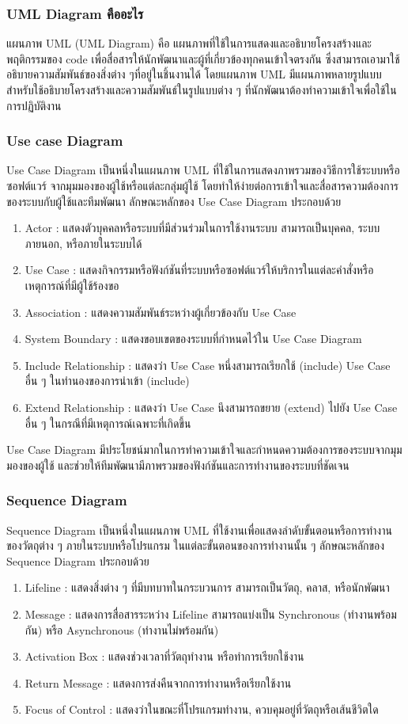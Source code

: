 \documentclass[14pt,oneside,openright,a4paper]{cpe-thai-project}
\begin{document}
\subsubsection{UML Diagram คืออะไร}
แผนภาพ UML \cite{UML} (UML Diagram) คือ แผนภาพที่ใช้ในการแสดงและอธิบายโครงสร้างและพฤติกรรมของ code เพื่อสื่อสารให้นักพัฒนาและผู้ที่เกี่ยวข้องทุกคนเข้าใจตรงกัน ซึ่งสามารถเอามาใช้อธิบายความสัมพันธ์ของสิ่งต่าง ๆที่อยู่ในชิ้นงานได้ โดยแผนภาพ UML มีแผนภาพหลายรูปแบบสำหรับใช้อธิบายโครงสร้างและความสัมพันธ์ในรูปแบบต่าง ๆ ที่นักพัฒนาต้องทำความเข้าใจเพื่อใช้ในการปฏิบัติงาน
\subsubsection{Use case Diagram}
Use Case Diagram เป็นหนึ่งในแผนภาพ UML ที่ใช้ในการแสดงภาพรวมของวิธีการใช้ระบบหรือซอฟต์แวร์ จากมุมมองของผู้ใช้หรือแต่ละกลุ่มผู้ใช้ โดยทำให้ง่ายต่อการเข้าใจและสื่อสารความต้องการของระบบกับผู้ใช้และทีมพัฒนา
ลักษณะหลักของ Use Case Diagram ประกอบด้วย
\begin{enumerate}
  \item Actor : แสดงตัวบุคคลหรือระบบที่มีส่วนร่วมในการใช้งานระบบ สามารถเป็นบุคคล, ระบบภายนอก, หรือภายในระบบได้
  \item Use Case : แสดงกิจกรรมหรือฟังก์ชันที่ระบบหรือซอฟต์แวร์ให้บริการในแต่ละคำสั่งหรือเหตุการณ์ที่มีผู้ใช้ร้องขอ
  \item Association : แสดงความสัมพันธ์ระหว่างผู้เกี่ยวข้องกับ Use Case
  \item System Boundary : แสดงขอบเขตของระบบที่กำหนดไว้ใน Use Case Diagram
  \item Include Relationship : แสดงว่า Use Case หนึ่งสามารถเรียกใช้ (include) Use Case อื่น ๆ ในทำนองของการนำเข้า (include)
  \item Extend Relationship : แสดงว่า Use Case นึงสามารถขยาย (extend) ไปยัง Use Case อื่น ๆ ในกรณีที่มีเหตุการณ์เฉพาะที่เกิดขึ้น
\end{enumerate}
  Use Case Diagram มีประโยชน์มากในการทำความเข้าใจและกำหนดความต้องการของระบบจากมุมมองของผู้ใช้ และช่วยให้ทีมพัฒนามีภาพรวมของฟังก์ชันและการทำงานของระบบที่ชัดเจน
\subsubsection{Sequence Diagram}
  Sequence Diagram เป็นหนึ่งในแผนภาพ UML ที่ใช้งานเพื่อแสดงลำดับขั้นตอนหรือการทำงานของวัตถุต่าง ๆ ภายในระบบหรือโปรแกรม ในแต่ละขั้นตอนของการทำงานนั้น ๆ
  ลักษณะหลักของ Sequence Diagram ประกอบด้วย

    \begin{enumerate}
      \item Lifeline : แสดงสิ่งต่าง ๆ ที่มีบทบาทในกระบวนการ สามารถเป็นวัตถุ, คลาส, หรือนักพัฒนา
      \item Message : แสดงการสื่อสารระหว่าง Lifeline สามารถแบ่งเป็น Synchronous (ทำงานพร้อมกัน) หรือ Asynchronous (ทำงานไม่พร้อมกัน)
      \item Activation Box : แสดงช่วงเวลาที่วัตถุทำงาน หรือทำการเรียกใช้งาน
      \item Return Message : แสดงการส่งคืนจากการทำงานหรือเรียกใช้งาน
      \item Focus of Control : แสดงว่าในขณะที่โปรแกรมทำงาน, ควบคุมอยู่ที่วัตถุหรือเส้นชีวิตใด
    \end{enumerate}
\end{document}
